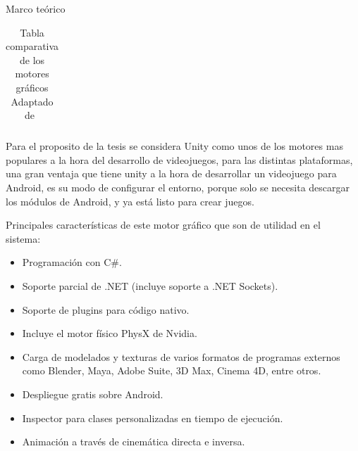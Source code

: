 \begin{thesischapter}{1} {Marco teórico}
\begin{table}[ht]
\begin{tabularx}{\textwidth}{|X|X|X|X|X|X|X|}
        \end{tabularx}
        \label{tab: graphics-engines}
        \caption{ Tabla comparativa de los motores gráficos \\ Adaptado de~\cite{gonjar2019desarrollo}}
    \end{table}
    
    
    \vspace{10pt}
    Para el proposito de la tesis se considera Unity como unos de los motores mas populares a la hora del desarrollo
    de videojuegos, para las distintas plataformas, una gran ventaja que tiene unity a la hora de
    desarrollar un videojuego para Android, es su modo de configurar el entorno, porque solo se necesita descargar los módulos de 
    Android, y ya está listo para crear juegos.
     
    \vspace{5pt}
    Principales características de este motor gráfico que son de utilidad en el sistema:~\cite{unity3d}
    \begin{itemize}
        \item Programación con C\#.
        \item Soporte parcial de .NET (incluye soporte a .NET Sockets).
        \item Soporte de plugins para código nativo.
        \item Incluye el motor físico PhysX de Nvidia.
        \item Carga de modelados y texturas de varios formatos de programas externos como Blender, Maya, Adobe Suite, 3D Max, Cinema 4D, entre otros.
        \item Despliegue gratis sobre Android.
        \item Inspector para clases personalizadas en tiempo de ejecución.
        \item Animación a través de cinemática directa e inversa.
    \end{itemize}


\end{thesischapter}
